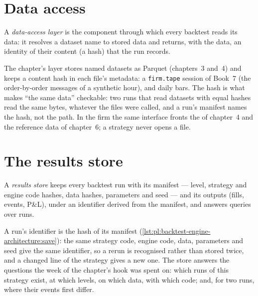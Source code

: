\section{Data access}

\begin{definition}\label{def:pl:backtest-engine-architecture:dal}
A \emph{data-access layer} is the component through which every backtest reads its data: it resolves a dataset
name to stored data and returns, with the data, an identity of their content (a hash) that the run records.
\end{definition}

The chapter's layer stores named datasets as Parquet (chapters~3 and~4) and keeps a content hash in each file's metadata: a
\texttt{firm.tape} session of Book~7 (the order-by-order messages of a synthetic hour), and daily bars. The hash is what makes ``the same
data'' checkable: two runs that read datasets with equal hashes read the same bytes, whatever the files were called, and a run's
manifest names the hash, not the path. In the firm the same interface fronts the  of chapter~4 and the reference data of
chapter~6; a strategy never opens a file.

\section{The results store}

\begin{definition}\label{def:pl:backtest-engine-architecture:results}
A \emph{results store} keeps every backtest run with its manifest --- level, strategy and engine code hashes, data
hashes, parameters and seed --- and its outputs (fills, events, P\&L), under an identifier derived from the manifest, and answers
queries over runs.
\end{definition}

A run's identifier is the hash of its manifest (\cref{lst:pl:backtest-engine-architecture:save}): the same strategy code, engine code,
data, parameters and seed give the same identifier, so a rerun is recognised rather than stored twice, and a changed line of the
strategy gives a new one. The store answers the questions the week of the chapter's hook was spent on: which runs of this strategy
exist, at which levels, on which data, with which code; and, for two runs, where their events first differ.

